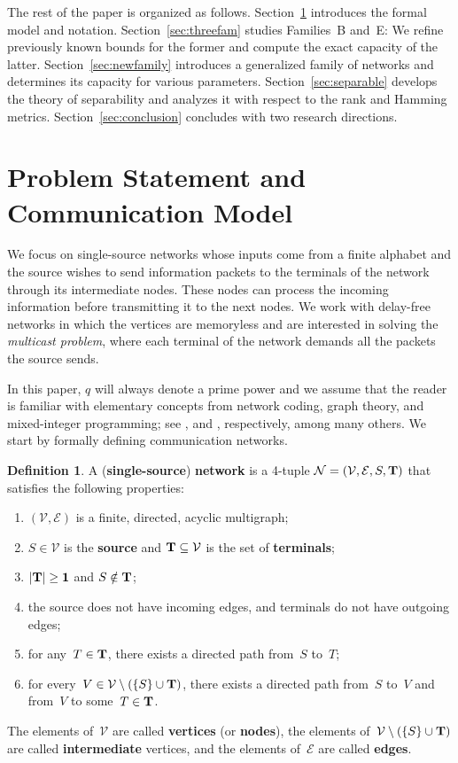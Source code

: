 \documentclass[11pt,a4paper]{article}
\theoremstyle{definition}
\newtheorem{definition}[theorem]{Definition}
\newcommand{\mN}{\mathcal{N}}
\newcommand{\mE}{\mathcal{E}}
\newcommand{\mV}{\mathcal{V}}
\newcommand{\bfT}{\bf T}
\begin{document}
The rest of the paper is organized as follows. Section~\ref{sec:intro} introduces the formal model and notation. Section~\ref{sec:threefam} studies Families~B and~E: We refine previously known bounds for the former and compute the exact capacity of the latter. Section~\ref{sec:newfamily} introduces a generalized family of networks and determines its capacity for various parameters. Section~\ref{sec:separable} develops the theory of separability and analyzes it with respect to the rank and Hamming metrics. Section~\ref{sec:conclusion} concludes with two research directions.

\section{Problem Statement and Communication Model}
\label{sec:intro}

We focus on single-source networks whose inputs come from a finite alphabet and the source wishes to send information packets to the terminals of the network through its intermediate nodes. These nodes can process the incoming information before transmitting it to the next nodes. We work with delay-free networks in which the vertices are memoryless and are interested in solving the \textit{multicast problem},
where each terminal of the network demands all the packets the source sends. 

In this paper, $q$ will always denote a prime power and we assume that the reader is familiar with elementary concepts from network coding, graph theory, and mixed-integer programming;
see \cite{b12}, \cite{b22} and \cite{b29}, respectively, among many others. We start by formally defining communication networks.

\begin{definition}
\label{def:network}
A (\textbf{single-source}) \textbf{network}  is a 4-tuple $\mN=(\mV,\mE, S, \bfT)$ 
that satisfies the following properties:
\begin{enumerate}
\item $(\mV,\mE)$ is a finite, directed, acyclic multigraph;
\item $S \in \mV$ is the \textbf{source} and $\bfT \subseteq \mV$ is the set of \textbf{terminals};
\item $\lvert \bfT \rvert \ge 1$ and $S \notin \bfT$;
\item the source does not have incoming edges, and terminals do not have outgoing edges;
\item \label{prnE} for any~$T \in \bfT$, there exists a directed path from~$S$ to~$T$;
\item for every~$V \in \mV \setminus (\{S\} \cup \bfT)$, there exists a directed path from~$S$ to~$V$ and from~$V$ to some~$T \in \bfT$. 
\end{enumerate}
The elements of~$\mV$ are called \textbf{vertices}  (or \textbf{nodes}), the elements of~$\mV \setminus (\{S\} \cup \bfT)$ are called \textbf{intermediate} vertices, and the elements of~$\mE$ are called \textbf{edges}.
\end{definition}
\end{document}
